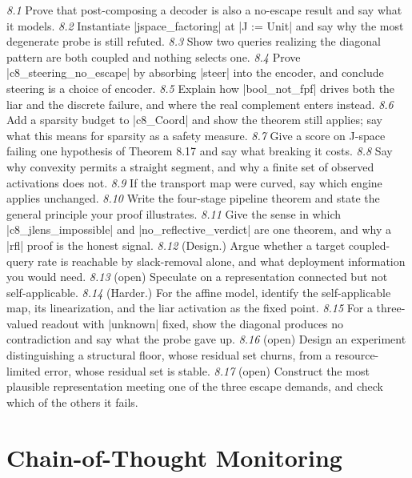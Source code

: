\documentclass{memoir}
\begin{document}
\emph{8.1} Prove that post-composing a decoder is also a no-escape result and say what it
models.
\emph{8.2} Instantiate \LeanVerb|jspace_factoring| at \LeanVerb|J := Unit| and say why the most
degenerate probe is still refuted.
\emph{8.3} Show two queries realizing the diagonal pattern are both coupled and nothing
selects one.
\emph{8.4} Prove \LeanVerb|c8_steering_no_escape| by absorbing \LeanVerb|steer| into the encoder, and
conclude steering is a choice of encoder.
\emph{8.5} Explain how \LeanVerb|bool_not_fpf| drives both the liar and the discrete failure,
and where the real complement enters instead.
\emph{8.6} Add a sparsity budget to \LeanVerb|c8_Coord| and show the theorem still applies;
say what this means for sparsity as a safety measure.
\emph{8.7} Give a score on J-space failing one hypothesis of Theorem 8.17 and say what
breaking it costs.
\emph{8.8} Say why convexity permits a straight segment, and why a finite set of observed
activations does not.
\emph{8.9} If the transport map were curved, say which engine applies unchanged.
\emph{8.10} Write the four-stage pipeline theorem and state the general principle your proof
illustrates.
\emph{8.11} Give the sense in which \LeanVerb|c8_jlens_impossible| and
\LeanVerb|no_reflective_verdict| are one theorem, and why a \LeanVerb|rfl| proof is the honest
signal.
\emph{8.12} (Design.) Argue whether a target coupled-query rate is reachable by
slack-removal alone, and what deployment information you would need.
\emph{8.13} (open) Speculate on a representation connected but not self-applicable.
\emph{8.14} (Harder.) For the affine model, identify the self-applicable map, its
linearization, and the liar activation as the fixed point.
\emph{8.15} For a three-valued readout with \LeanVerb|unknown| fixed, show the diagonal produces no
contradiction and say what the probe gave up.
\emph{8.16} (open) Design an experiment distinguishing a structural floor, whose residual
set churns, from a resource-limited error, whose residual set is stable.
\emph{8.17} (open) Construct the most plausible representation meeting one of the three
escape demands, and check which of the others it fails.



\section{Chain-of-Thought Monitoring}\label{Two--Schemas--of--Impossibility-005F-005F-005F--Machine--Checked--Limits--of--Trustworthy--Machine--Learning-005F-005F-005F--and--Why--They--Tighten--with--Capability----Exercises----Chain--of--Thought--Monitoring}
\end{document}
